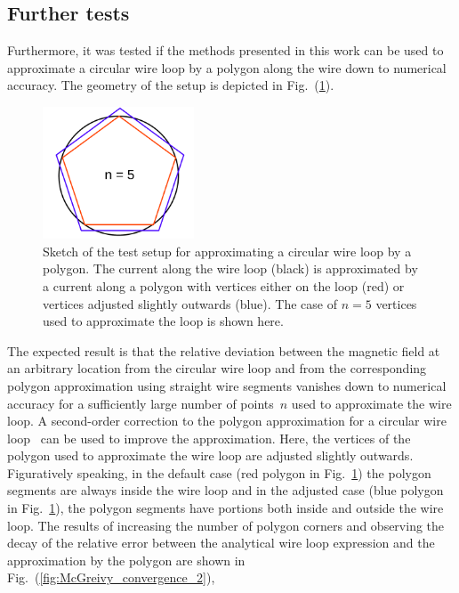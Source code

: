 \FloatBarrier
\subsection{Further tests}
Furthermore, it was tested if the methods presented in this work
can be used to approximate a circular wire loop
by a polygon along the wire down to numerical accuracy.
The geometry of the setup is depicted in Fig.~(\ref{fig:sketch_McGreivy}).
\begin{figure}[htbp]
 \centering
 \includegraphics[width=0.4\textwidth]{img/sketch_McGreivy.png}
 \caption{Sketch of the test setup for approximating a circular wire loop by a polygon.
          The current along the wire loop (black) is approximated by
          a current along a polygon with vertices either on the loop (red)
          or vertices adjusted slightly outwards (blue).
          The case of $n=5$ vertices used to approximate the loop is shown here.}
 \label{fig:sketch_McGreivy}
\end{figure}
The expected result is that the relative deviation between
the magnetic field at an arbitrary location
from the circular wire loop and from the corresponding polygon approximation
using straight wire segments vanishes down to numerical accuracy
for a sufficiently large number of points~$n$ used to approximate the wire loop.
A second-order correction to the polygon approximation
for a circular wire loop~\cite{mcgreivy_2021} can be used
to improve the approximation.
Here, the vertices of the polygon used to approximate the wire loop
are adjusted slightly outwards.
Figuratively speaking, in the default case (red polygon in Fig.~\ref{fig:sketch_McGreivy})
the polygon segments are always inside the wire loop
and in the adjusted case (blue polygon in Fig.~\ref{fig:sketch_McGreivy}),
the polygon segments have portions both inside and outside the wire loop.
The results of increasing the number of polygon corners
and observing the decay of the relative error between the analytical wire loop
expression and the approximation by the polygon
are shown in Fig.~(\ref{fig:McGreivy_convergence_2}),
